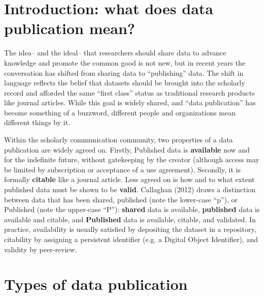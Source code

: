 \documentclass[10pt,a4paper,twocolumn]{article}
\begin{document}
\section*{Introduction: what does data publication mean?}\label{introduction}

The idea– and the ideal– that researchers should share data to advance knowledge and promote the common good is not new, but in recent years the conversation has shifted from sharing data to ``publishing'' data.\cite{costello_motivating_2009,smith_data_2009,lawrence_data_2011,sarah_callaghan_making_2012}
The shift in language reflects the belief that datasets should be brought into the scholarly record and afforded the same ``first class'' status as traditional research products like journal articles.  
While this goal is widely shared, and ``data publication'' has become something of a buzzword, different people and organizations mean different things by it.

Within the scholarly communication community, two properties of a data publication are widely agreed on.\cite{smith_data_2009,sarah_callaghan_making_2012}
Firstly, Published data is \textbf{available} now and for the indefinite future, without gatekeeping by the creator (although access may be limited by subscription or acceptance of a use agreement).
Secondly, it is formally \textbf{citable} like a journal article.
Less agreed on is how and to what extent published data must be shown to be \textbf{valid}.
Callaghan (2012)\cite{sarah_callaghan_making_2012} draws a distinction between data that has been shared, published (note the lower-case “p”), or Published (note the upper-case “P”): \textbf{shared} data is available, \textbf{published} data is available and citable, and \textbf{Published} data is available, citable, and validated. 
In practice, availability is usually satisfied by depositing the dataset in a repository, citability by assigning a persistent identifier (e.g. a Digital Object Identifier), and validity by peer-review.


\section*{Types of data publication}\label{types-of-data-publication}
\end{document}
